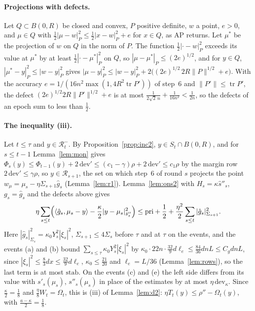 \documentclass[11pt]{amsart}
\theoremstyle{definition}
\numberwithin{equation}{section}
\newcommand{\tr}{\operatorname{tr}}
\newcommand{\ip}[1]{\langle #1\rangle}
\begin{document}
\paragraph{Projections with defects.} Let $Q\subset B(0,R)$ be closed and convex, $P$ positive definite, $w$ a point, $e>0$, and $\mu\in Q$ with $\frac12|\mu-w|^2_P\le\frac12|x-w|^2_P+e$ for $x\in Q$, as AP returns. Let $\mu^*$ be the projection of $w$ on $Q$ in the norm of $P$. The function $\frac12|\cdot-w|_P^2$ exceeds its value at $\mu^*$ by at least $\frac12|\cdot-\mu^*|^2_P$ on $Q$, so $|\mu-\mu^*|_P\le(2e)^{1/2}$, and for $y\in Q$, $|\mu^*-y|^2_P\le|w-y|^2_P$ gives $|\mu-y|^2_P\le|w-y|^2_P+2\bigl((2e)^{1/2}\,2R\|P\|^{1/2}+e\bigr)$. With the accuracy $e=1/(16n^2\max(1,4R^2\tr P'))$ of step~6 and $\|P'\|\le\tr P'$, the defect $(2e)^{1/2}2R\|P'\|^{1/2}+e$ is at most $\frac1{2\sqrt2\,n}+\frac1{16n^2}<\frac1{2n}$, so the defects of an epoch sum to less than $\frac12$.

\paragraph{The inequality (iii).} Let $t\le\tau$ and $y\in\mathcal R^-_t$. By Proposition~\ref{prop:inc2}, $y\in S_{t}\cap B(0,R)$, and for $s\le t-1$ Lemma~\ref{lem:mon} gives $\Phi_s(y)\le\Phi_{t-1}(y)+2\,\mathrm{dev}'\le(c_1-\gamma)\rho+2\,\mathrm{dev}'\le c_1\rho$ by the margin row $2\,\mathrm{dev}'\le\gamma\rho$, so $y\in\mathcal R_{s+1}$, the set on which step~6 of round $s$ projects the point $w_\mu=\mu_s-\eta\Sigma_{s+1}\hat g_s$ (Lemma~\ref{lem:r1}). Lemma~\ref{lem:ons2} with $H_s=\kappa\hat s''_s$, $g_s=\hat g_s$ and the defects above gives
\[
\eta\sum_{s\le t}\Bigl(\ip{\hat g_s,\mu_s-y}-\frac\kappa2|y-\mu_s|^2_{\hat s''_s}\Bigr)\le\mathrm{pri}+\frac12+\frac{\eta^2}2\sum_{s\le t}|\hat g_s|^2_{\Sigma_{s+1}} .
\]
Here $|\hat g_s|^2_{\Sigma_s}=\kappa_0Y_s^2|\xi_s|^2$, $\Sigma_{s+1}\le4\Sigma_s$ before $\tau$ and at $\tau$ on the events, and the events (a) and (b) bound $\sum_{s\le\tau}\kappa_0Y_s^2|\xi_s|^2$ by $\kappa_0\cdot22n\cdot\frac{32}9d\ell_e\le\frac{84}{36}dnL\le C_gdnL$, since $|\xi_s|^2\le\frac83dx\le\frac{32}9d\ell_e$, $\kappa_0\le\frac{21}{20}$ and $\ell_e=L/36$ (Lemma~\ref{lem:rows}), so the last term is at most $\mathrm{stab}$. On the events (c) and (e) the left side differs from its value with $s'_s(\mu_s)$, $s''_s(\mu_s)$ in place of the estimates by at most $\eta\,\mathrm{dev}_\kappa$. Since $\frac\kappa2=\frac18$ and $\frac\eta8W_t=\Omega_t$, this is (iii) of Lemma~\ref{lem:d2}: $\eta T_t(y)\le\rho''-\Omega_t(y)$, with $\frac{a-\kappa}2=\frac18$.
\end{document}
